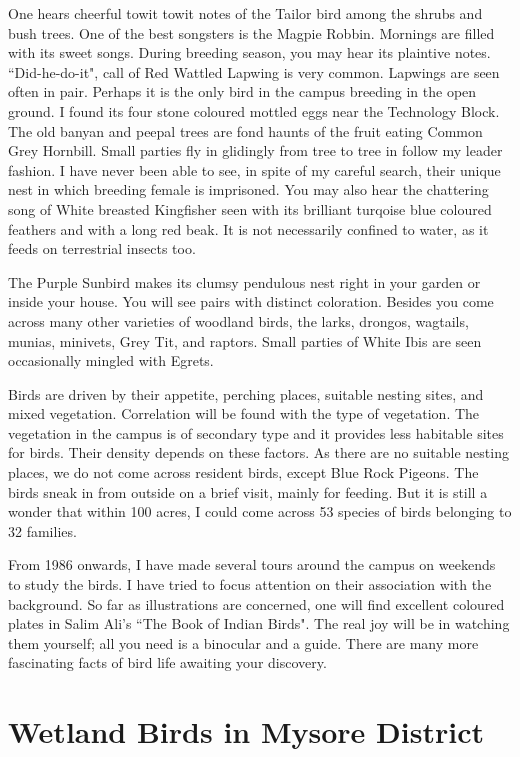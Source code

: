 One hears cheerful towit towit notes of the Tailor bird among the 
shrubs and bush trees. One of the best songsters is the Magpie Robbin. 
Mornings are filled with its sweet songs. During breeding season, you may 
hear its plaintive notes. ``Did-he-do-it", call of Red Wattled Lapwing is very 
common. Lapwings are seen often in pair. Perhaps it is the only bird in the 
campus breeding in the open ground. I found its four stone coloured mottled 
eggs near the Technology Block. The old banyan and peepal trees are fond 
haunts of the fruit eating Common Grey Hornbill. Small parties fly in 
glidingly from tree to tree in follow my leader fashion. I have never been 
able to see, in spite of my careful search, their unique nest in which breeding 
female is imprisoned. You may also hear the chattering song of 
White breasted Kingfisher seen with its brilliant turqoise blue coloured 
feathers and with a long red beak. It is not necessarily confined to water, as 
it feeds on terrestrial insects too. 

The Purple Sunbird makes its clumsy pendulous nest right in your 
garden or inside your house. You will see pairs with distinct coloration. 
Besides you come across many other varieties of woodland birds, the larks, 
drongos, wagtails, munias, minivets, Grey Tit, and raptors. Small parties of 
White Ibis are seen occasionally mingled with Egrets. 

Birds are driven by their appetite, perching places, suitable nesting 
sites, and mixed vegetation. Correlation will be found with the type of vegetation. The vegetation in the campus is of secondary 
type and it provides less habitable sites for birds. Their density depends on 
these factors. As there are no suitable nesting places, we do not come across 
resident birds, except Blue Rock Pigeons. The birds sneak in from outside on a brief visit, 
mainly for feeding. But it is still a wonder that within 100 acres, I could 
come across 53 species of birds belonging to 32 families. 

From 1986 onwards, I have made several tours around the campus on 
weekends to study the birds. I have tried to focus attention on their 
association with the background. So far as illustrations are concerned, one 
will find excellent coloured plates in Salim Ali's ``The Book of Indian 
Birds". The real joy will be in watching them yourself; all you need is a
binocular and a guide. There are many more fascinating facts of bird life 
awaiting your discovery. 

\chapter{Wetland Birds in Mysore District}%

